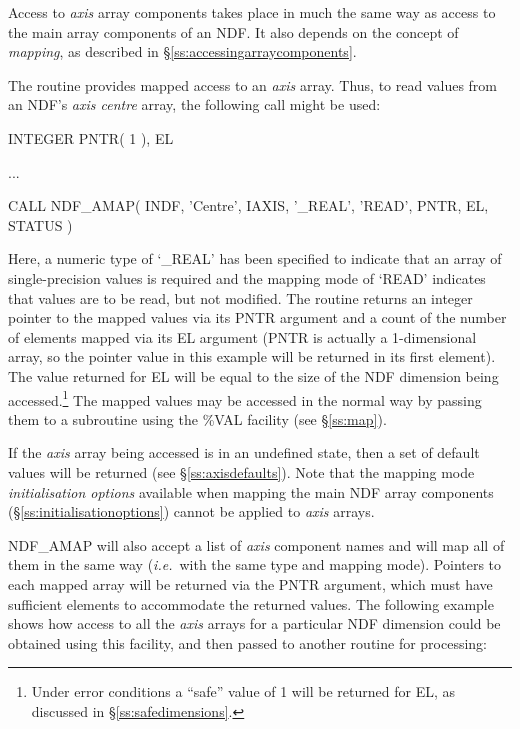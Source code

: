 \documentclass[twoside,11pt,nolof]{starlink}
\providecommand{\st}[1]{{\emph{#1}}}
\begin{document}
Access to \st{axis\/} array components takes place in much the same way as
access to the main array components of an NDF.
It also depends on the concept of \st{mapping}, as described in
\S\ref{ss:accessingarraycomponents}.

The routine  provides mapped access to an \st{axis\/} array.
Thus, to read values from an NDF's \st{axis centre\/} array, the following
call might be used:

\small
\begin{terminalv}
      INTEGER PNTR( 1 ), EL

      ...

      CALL NDF_AMAP( INDF, 'Centre', IAXIS, '_REAL', 'READ', PNTR, EL, STATUS )
\end{terminalv}
\normalsize

Here, a numeric type of `\_REAL' has been specified to indicate that an
array of single-precision values is required and the mapping mode of `READ'
indicates that values are to be read, but not modified.
The routine returns an integer pointer to the mapped values via its PNTR
argument and a count of the number of elements mapped via its EL argument
(PNTR is actually a 1-dimensional array, so the pointer value in this
example will be returned in its first element).
The value returned for EL will be equal to the size of the NDF dimension
being accessed.\footnote{Under error conditions a ``safe'' value of 1 will
be returned for EL, as discussed in \S\ref{ss:safedimensions}.}
The mapped values may be accessed in the normal way by passing them to a
subroutine using the \%VAL facility (see \S\ref{ss:map}).

If the \st{axis\/} array being accessed is in an undefined state, then a
set of default values will be returned (see \S\ref{ss:axisdefaults}).
Note that the mapping mode \st{initialisation options\/} available when
mapping the main NDF array components (\S\ref{ss:initialisationoptions})
cannot be applied to \st{axis\/} arrays.

NDF\_AMAP will also accept a list of \st{axis\/} component names and will
map all of them in the same way (\st{i.e.}\ with the same type and mapping
mode).
Pointers to each mapped array will be returned via the PNTR argument, which
must have sufficient elements to accommodate the returned values.
The following example shows how access to all the \st{axis\/} arrays for a
particular NDF dimension could be obtained using this facility, and then
passed to another routine for processing:
\end{document}
